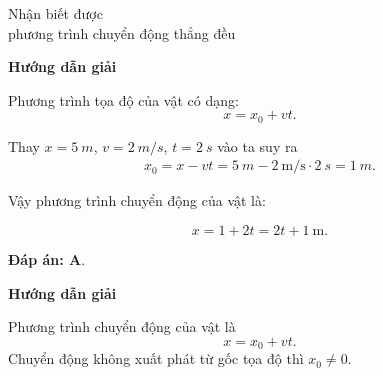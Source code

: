 \begin{dang}{Nhận biết được\\ phương trình chuyển động thẳng đều}
	{	\begin{center}
			\textbf{Hướng dẫn giải}
		\end{center}
		
		Phương trình tọa độ của vật có dạng: 
		$$x=x_0 +vt.$$
		
		Thay $x=\SI{5}{m}$, $v=\SI{2}{m/s}$, $t=\SI{2}{s}$ vào ta suy ra 
			\begin{align*}
				x_0=x-vt=\SI{5}{m}-\SI{2}{\meter/\second}\cdot\SI{2}{s}=\SI{1}{m}.
			\end{align*}
		
		Vậy phương trình chuyển động của vật là:
		
		$$x=1+2t =2t+\SI{1}{\meter}.$$
		
		\textbf{Đáp án: A}.
	}
	{	\begin{center}
			\textbf{Hướng dẫn giải}
		\end{center}
Phương trình chuyển động của vật là 
$$x=x_0 +vt.$$	
Chuyển động không xuất phát từ gốc tọa độ thì $x_0 \neq  0$.

}
\end{dang}
